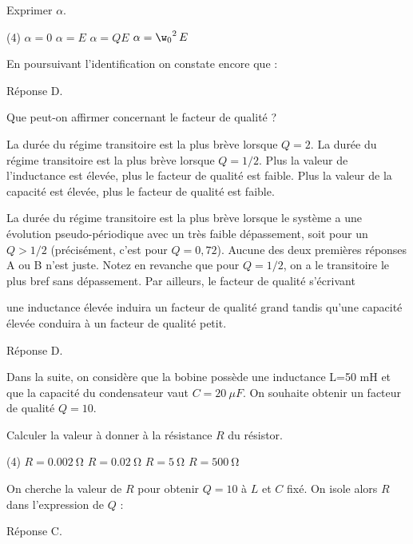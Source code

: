 \documentclass[a4paper, 12pt, final, garamond]{book}
\begin{document}
\QR
{Exprimer  $\alpha$.
\begin{tasks}[label=\protect\fbox{\Alph*}, label-width=4ex](4)
	\task $\alpha=0$
	\task $\alpha=E$
	\task $\alpha=QE$
	\task $\alpha= {\w_0}^2 \, E$
\end{tasks}
}
{
En poursuivant l’identification on constate encore que :


\medskip

\noindent
Réponse D.
}

\QR
{Que peut-on affirmer concernant le facteur de qualité ?

	\begin{tasks}[label=\protect\fbox{\Alph*}, label-width=4ex]
		\task La durée du régime transitoire est la plus brève lorsque $Q=2$.
		\task La durée du régime transitoire est la plus brève lorsque $Q=1/2$.
		\task Plus la valeur de l’inductance est élevée, plus le facteur de qualité est faible.
		\task Plus la valeur de la capacité est élevée, plus le facteur de qualité est faible.
	\end{tasks}
}
{

	La durée du régime transitoire est la plus brève lorsque le système a une
	évolution pseudo-périodique avec un très faible dépassement, soit pour un
	$Q>1/2$ (précisément, c’est pour $Q=0,72$). Aucune des deux premières
	réponses A ou B n’est juste. Notez en revanche que pour $Q=1/2$, on a le
	transitoire le plus bref sans dépassement. Par ailleurs, le facteur de
	qualité s’écrivant


	\noindent
	une inductance élevée induira un facteur de qualité grand tandis qu’une capacité élevée conduira à un facteur de qualité petit.

	\medskip

	\noindent
	Réponse D.
}

\enonce
{Dans la suite, on considère que la bobine possède une inductance L=50 mH et que la capacité du condensateur vaut  $C =\SI{20}{\mu F}$. On souhaite obtenir un facteur de qualité $Q=10$.}

\QR
{Calculer la valeur à donner à la résistance $R$ du résistor.

	\begin{tasks}[label=\protect\fbox{\Alph*}, label-width=4ex](4)
		\task $R=\SI{0,002}{\ohm}$
		\task $R=\SI{0,02}{\ohm}$
		\task $R=\SI{5}{\ohm}$
		\task $R=\SI{500}{\ohm}$
	\end{tasks}
}
{
	On cherche la valeur de $R$ pour obtenir $Q=10$ à $L$ et $C$ fixé.
	On isole alors $R$ dans l’expression de $Q$ :



	\medskip

	\noindent
	Réponse C.
}
\end{document}
